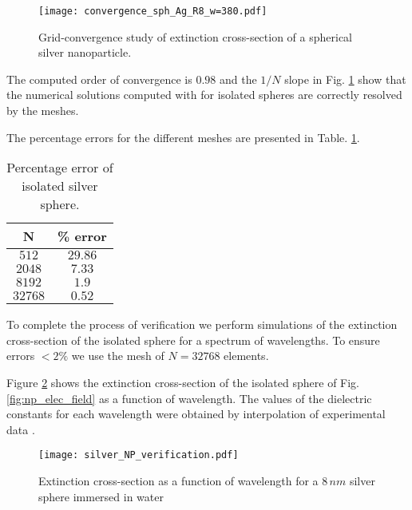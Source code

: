 \begin{figure}[h] %
   \centering
   \texttt{[image: convergence\_sph\_Ag\_R8\_w=380.pdf]} 
   \caption{Grid-convergence study of extinction cross-section of a spherical silver
            nanoparticle.}
   \label{fig:error_sphere_Ag}
\end{figure}

The computed order of convergence is $0.98$ and the $1/N$ slope in Fig. \ref{fig:error_sphere_Ag}
show that the numerical solutions computed with \pygbe for isolated spheres are
correctly resolved by the meshes.

The percentage errors for the different meshes are presented in Table. \ref{table:err_iso_sphere}.

\begin{table}[h]
    \centering
    \caption{\label{table:err_iso_sphere} Percentage error of isolated silver sphere.} 
    \begin{tabular}{c c}
    \hline%
    N & \% error \\
    \hline%
     $512$ & $29.86$ \\
     $2048$ & $7.33$ \\
     $8192$ & $1.9$ \\
     $32768$ & $0.52$ \\
    \hline%
    \end{tabular}
\end{table}


To complete the process of verification we perform simulations of the extinction 
cross-section of the isolated sphere for a spectrum of wavelengths. To ensure 
errors $<2\%$ we use the mesh of $N=32768$ elements. 

Figure \ref{fig:verif_sphere} shows the extinction cross-section of the isolated
sphere of Fig.\ref{fig:np_elec_field} as a function of wavelength. The values of 
the dielectric constants for each wavelength were obtained by interpolation of 
experimental data \cite{JohnsonChristy1972, HaleQuerry1972}.


\begin{figure}[h] %
   \centering
   \texttt{[image: silver\_NP\_verification.pdf]} 
   \caption{Extinction cross-section as a function of wavelength for a $8 \, nm$
            silver sphere immersed in water}
   \label{fig:verif_sphere}
\end{figure}


